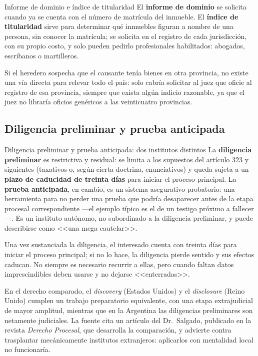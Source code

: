 \documentclass[12pt,oneside]{book}
\begin{document}
\begin{definition}{Informe de dominio e índice de titularidad}
El \textbf{informe de dominio} se solicita cuando ya se cuenta con el número de matrícula del inmueble. El \textbf{índice de titularidad} sirve para determinar qué inmuebles figuran a nombre de una persona, sin conocer la matrícula; se solicita en el registro de cada jurisdicción, con su propio costo, y solo pueden pedirlo profesionales habilitados: abogados, escribanos o martilleros.
\end{definition}

Si el heredero sospecha que el causante tenía bienes en otra provincia, no existe una vía directa para relevar todo el país: solo cabría solicitar al juez que oficie al registro de esa provincia, siempre que exista algún indicio razonable, ya que el juez no libraría oficios genéricos a las veinticuatro provincias.

\subsection{Diligencia preliminar y prueba anticipada}

\begin{definition}{Diligencia preliminar y prueba anticipada: dos institutos distintos}
La \textbf{diligencia preliminar} es restrictiva y residual: se limita a los supuestos del artículo 323 y siguientes (taxativos o, según cierta doctrina, enunciativos) y queda sujeta a un \textbf{plazo de caducidad de treinta días} para iniciar el proceso principal. La \textbf{prueba anticipada}, en cambio, es un sistema asegurativo probatorio: una herramienta para no perder una prueba que podría desaparecer antes de la etapa procesal correspondiente ---el ejemplo típico es el de un testigo próximo a fallecer---. Es un instituto autónomo, no subordinado a la diligencia preliminar, y puede describirse como <<una mega cautelar>>.
\end{definition}

Una vez sustanciada la diligencia, el interesado cuenta con treinta días para iniciar el proceso principal; si no lo hace, la diligencia pierde sentido y sus efectos caducan. No siempre es necesario recurrir a ellas, pero cuando faltan datos imprescindibles deben usarse y no dejarse <<enterradas>>.

\begin{note}
En el derecho comparado, el \emph{discovery} (Estados Unidos) y el \emph{disclosure} (Reino Unido) cumplen un trabajo preparatorio equivalente, con una etapa extrajudicial de mayor amplitud, mientras que en la Argentina las diligencias preliminares son netamente judiciales. La fuente cita un artículo del Dr.\ Salgado, publicado en la revista \emph{Derecho Procesal}, que desarrolla la comparación, y advierte contra trasplantar mecánicamente institutos extranjeros: aplicarlos con mentalidad local no funcionaría.
\end{note}
\end{document}
